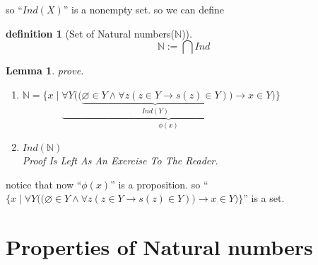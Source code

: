 \documentclass[10pt,a4paper]{book}
\let\emptyset\varnothing
\newtheorem{definition}{definition}[section]
\newtheorem{lemma}{Lemma}[section]
\begin{document}
so ``$Ind(X)$'' is a nonempty set. so we can define

\begin{definition}
    [Set of Natural numbers($\mathbb{N}$)]

    \[ \mathbb{N} := \bigcap Ind \]

\end{definition}

\begin{lemma}
    \textbf{}  prove.

    \begin{enumerate}
        \setlength{\itemsep}{0pt} %
        \item       $ \mathbb{N} = \{ x  \mid \underbrace{\forall Y \Big( \big( \underbrace{\emptyset \in Y \wedge \forall z (z \in Y \to s(z)\in Y)}_{Ind(Y)} \big) \to x \in Y \Big)}_{\phi(x)} \} $
        \item       $ Ind(\mathbb{N}) $\\
              Proof Is Left As An Exercise To The Reader.
    \end{enumerate}
\end{lemma}

notice that now ``$\phi(x)$'' is a proposition. so ``$\{ x \mid \forall Y \Big(
    \big( \emptyset \in Y \wedge \forall z (z \in Y \to s(z)\in Y) \big) \to x \in
    Y \Big) \}$'' is a set.

\section{Properties of Natural numbers}
\end{document}
